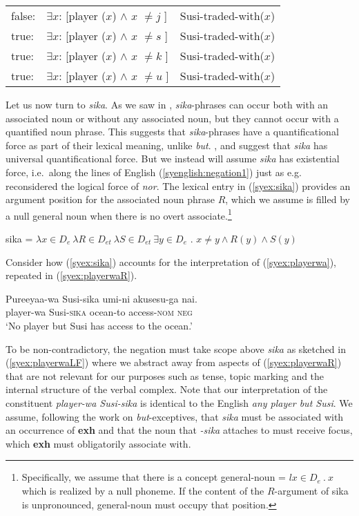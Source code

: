 \documentclass[output=paper]{langscibook}
\begin{document}
\ea \label{syex:anyonebut}
    \begin{tabular}[t]{@{}l@{~}l@{~$\land$~}l@{}}
    false: & $\exists x$: [player ($x$) $\land$ $x$ $\neq j$ ] & Susi-traded-with($x$)\\
    true:  & $\exists x$: [player ($x$) $\land$ $x$ $\neq s$ ] & Susi-traded-with($x$)\\
    true:  & $\exists x$: [player ($x$) $\land$ $x$ $\neq k$ ] & Susi-traded-with($x$)\\
    true:  & $\exists x$: [player ($x$) $\land$ $x$ $\neq u$ ] & Susi-traded-with($x$)\\
    \end{tabular}
\z


Let us now turn to \emph{sika}.  As we saw in , \emph{sika}-phrases can occur both with an associated noun or without any associated noun, but they cannot occur with a quantified noun phrase.
This suggests that \emph{sika}-phrases have a quantificational force as part of their lexical meaning, unlike \emph{but}.
\citet{alonso-ovalle04a}, \citet{kawahara08a} and \citet{yoshimura2007b} suggest that \emph{sika} has universal quantificational force.
But we instead will assume \emph{sika} has existential force, i.e.\ along the lines of English (\ref{syenglish:negation1}) just as e.g.\ \citet{wurmbrand08b} reconsidered the logical force of \emph{nor}.
The lexical entry in (\ref{syex:sika}) provides an argument position for the associated noun phrase $R$, which we assume is filled by a null general noun when there is no overt associate.\footnote{Specifically, we assume that there is a concept \textsf{general-noun} = $l x \in D_e\ .\ x$ which is realized by a null phoneme.  If the content of the $R$-argument of \textsf{sika} is unpronounced, \textsf{general-noun} must occupy that position.}

\ea \label{syex:sika} 
   \textsf{sika} = $\lambda x \in D_e\ \lambda R \in D_{et}\ \lambda S \in D_{et}\ \exists y \in D_e$ . $x \neq y \land R(y) \land S(y)$\z

Consider how (\ref{syex:sika}) accounts for the interpretation of (\ref{syex:playerwa}), repeated in (\ref{syex:playerwaR}).

\ea \label{syex:playerwaR}
\gll Pureeyaa-wa Susi-sika umi-ni akusesu-ga nai.\\
player-wa Susi-\textsc{sika} ocean-{to} access-\textsc{nom} \textsc{neg}\\
\glt `No player but Susi  has access to the ocean.'\z

To be non-contradictory, the negation must take scope above \emph{sika} as sketched in (\ref{syex:playerwaLF}) where we abstract away from  aspects of (\ref{syex:playerwaR}) that are not relevant for our purposes such as tense,  topic marking and the internal structure of the verbal complex.
Note that our interpretation of the constituent \emph{player-wa Susi-sika} is identical to the English \emph{any player but Susi}.
We assume, following the work on \emph{but}-exceptives, that \emph{sika} must be associated with an occurrence of \textbf{exh} and that the noun that \emph{-sika} attaches to must receive focus, which \textbf{exh} must obligatorily associate with.
\end{document}
